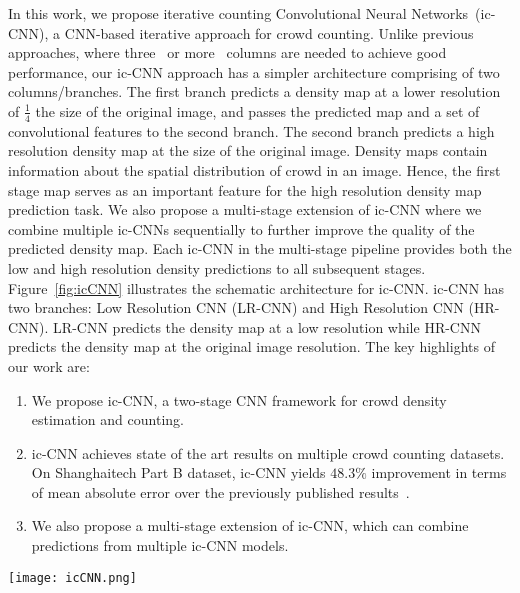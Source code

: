 \documentclass[runningheads]{llncs}
\begin{document}
In this work, we propose iterative counting Convolutional Neural Networks~(ic-CNN), a CNN-based iterative approach for crowd counting. Unlike previous approaches, where  three~\cite{zhang2016single,sam2017switching} or more~\cite{sindagi2017generating} columns are needed to achieve good performance, our ic-CNN approach has a simpler architecture comprising of two columns/branches. The first branch predicts a  density map at a lower resolution of $\frac{1}{4}$ the size of the original image, and passes the predicted map and a set of convolutional features to the second branch. The second branch predicts a high resolution density map at the size of the original image. Density maps contain information about the spatial distribution of crowd in an image. Hence, the first stage map serves as an important feature for the high resolution density map prediction task. We also propose a multi-stage extension of ic-CNN where we combine multiple ic-CNNs sequentially to further improve the quality of the predicted density map. Each ic-CNN in the multi-stage pipeline provides both the low and high resolution density predictions to all subsequent stages. Figure~\ref{fig:icCNN} illustrates the schematic architecture for ic-CNN. ic-CNN has two branches: Low Resolution CNN (LR-CNN) and High Resolution CNN (HR-CNN). LR-CNN predicts the density map at a low resolution while HR-CNN predicts the density map at the original image resolution. The key highlights of our work are:
 \begin{enumerate}
 \item We propose ic-CNN, a two-stage CNN framework for crowd density estimation and counting.
 
 \item ic-CNN achieves state of the art results on multiple crowd counting datasets. On Shanghaitech Part B dataset, ic-CNN yields $48.3\%$ improvement in terms of mean absolute error over the previously published results~\cite{sindagi2017generating}. 
 \item We also propose a multi-stage extension of ic-CNN, which can combine
 predictions from multiple ic-CNN models. 
 \end{enumerate}


\begin{figure*}[t]
\centering
\texttt{[image: icCNN.png]}
	\caption{
     Figure shows the ic-CNN architecture which consists of two columns/branches. On the top is the Low Resolution CNN branch (LR-CNN) and at the bottom is the High Resolution CNN branch (HR-CNN). LR-CNN predicts a density map at a lower resolution (LR). It passes the predicted density map and the convolutional feature maps to HR-CNN. HR-CNN fuses its feature maps with the feature maps and predicted density map from LR-CNN, and predicts a high resolution density map (HR) at the size of the original image. LR and HR are low and high resolution prediction maps respectively.
     \label{fig:icCNN}}	
\end{figure*}
\end{document}
